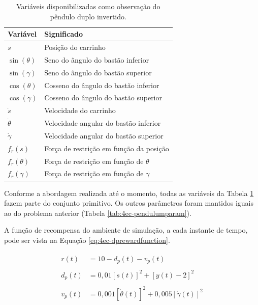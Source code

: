 \begin{table}[H]
	\centering
	\caption{Variáveis disponibilizadas como observação do pêndulo duplo invertido.}
	\label{tab:4ec-dpvarestado}
	\begin{tabular}{l|l} \toprule
		{Variável} & {Significado}\\ \midrule
		{$s$} & {Posição do carrinho} \\
		{$\sin(\theta)$} & {Seno do ângulo do bastão inferior} \\
		{$\sin{(\gamma)}$} & {Seno do ângulo do bastão superior} \\
		{$\cos(\theta)$} & {Cosseno do ângulo do bastão inferior} \\
		{$\cos(\gamma)$} & {Cosseno do ângulo do bastão superior} \\
		{$\dot{s}$} & {Velocidade do carrinho} \\
		{$\dot{\theta}$} & {Velocidade angular do bastão inferior} \\
		{$\dot{\gamma}$} & {Velocidade angular do bastão superior} \\
		{$f_r(s)$} & {Força de restrição em função da posição} \\
		{$f_r(\theta)$} & {Força de restrição em função de $\theta$} \\
		{$f_r(\gamma)$} & {Força de restrição em função de $\gamma$} \\
		\bottomrule
	\end{tabular}
\end{table}

Conforme a abordagem realizada até o momento, todas as variáveis da Tabela \ref{tab:4ec-dpvarestado} fazem parte do conjunto primitivo. Os outros parâmetros foram mantidos iguais ao do problema anterior (Tabela \ref{tab:4ec-pendulumparam}).

A função de recompensa do ambiente de simulação, a cada instante de tempo, pode ser vista na Equação \ref{eq:4ec-dprewardfunction}.

\begin{align}\label{eq:4ec-dprewardfunction}
\begin{split}
r(t) &= 10 - d_p(t) - v_p(t)\\\\
d_p(t) &= 0,01\left[s(t)\right]^2 + \left[y(t)-2\right]^2\\\\
v_p(t) &= 0,001\left[\dot{\theta}(t)\right]^2 + 0,005\left[\dot{\gamma}(t)\right]^2
\end{split}
\end{align}

